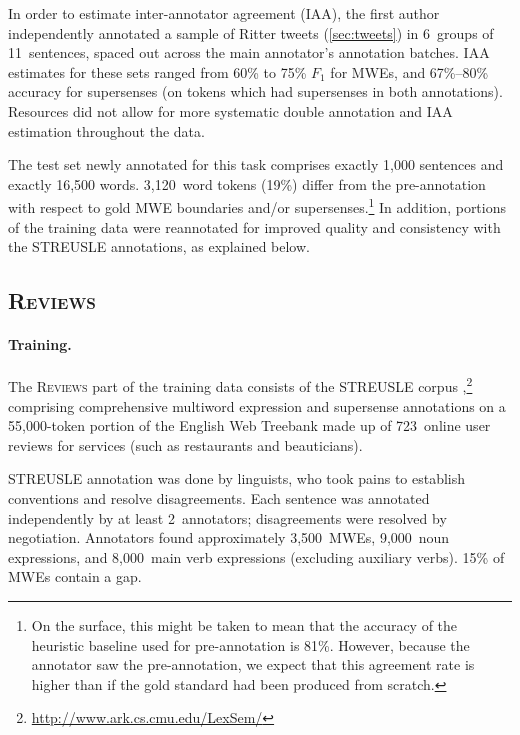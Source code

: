 \documentclass[11pt,letterpaper]{article}
\newcommand{\ensuretext}[1]{#1}
\newcommand{\nssmarker}{\ensuretext{\textcolor{magenta}{\ensuremath{^{\textsc{NS}}_{\textsc{S}}}}}}
\newcommand{\arkcomment}[3]{\ensuretext{\textcolor{#3}{[#1 #2]}}}
\newcommand{\nss}[1]{\arkcomment{\nssmarker}{#1}{magenta}}
\newcommand{\dataset}[1]{\mbox{\textsc{#1}}}	%
\newcommand{\finalversion}[1]{}
\begin{document}
In order to estimate inter-annotator agreement (IAA),
the first author independently annotated a sample of Ritter tweets (\cref{sec:tweets}) 
in 6~groups of 11~sentences, spaced out across the main annotator's annotation batches. 
IAA estimates for these sets ranged from 60\% to 75\% $F_1$ for MWEs, and 
67\%--80\% accuracy for supersenses (on tokens which had supersenses in both annotations).
Resources did not allow for more systematic double annotation and IAA estimation 
throughout the data.


The test set newly annotated for this task comprises exactly 1,000 sentences and exactly 16,500 words.
3,120~word tokens (19\%) differ from the pre-annotation with respect to gold MWE boundaries and/or supersenses.\footnote{On the surface, 
this might be taken to mean that the accuracy of the heuristic baseline used for pre-annotation is 81\%. 
However, because the annotator saw the pre-annotation, we expect that this agreement rate 
is higher than if the gold standard had been produced from scratch.}
In addition, portions of the training data were reannotated for improved quality and consistency 
with the STREUSLE annotations, as explained below.\finalversion{\nss{total size of training data?}}

\subsection{\dataset{Reviews}} 
\paragraph{Training.}
The \dataset{Reviews} part of the training data consists of the STREUSLE corpus \citep{schneider-14-corpus,schneider-15},\footnote{\url{http://www.ark.cs.cmu.edu/LexSem/}}
comprising comprehensive multiword expression and supersense annotations on a 55,000-token portion of the English Web Treebank \citep[EWTB;][]{ewtb} 
made up of 723~online user reviews for services (such as restaurants and beauticians).

STREUSLE annotation was done by linguists, who took pains to establish conventions and resolve disagreements.
Each sentence was annotated independently by at least 2~annotators; disagreements were resolved by negotiation. 
Annotators found approximately 3,500~MWEs, 9,000~noun expressions, and 8,000~main verb expressions (excluding auxiliary verbs).\finalversion{\nss{
(\Cref{tbl:reviews} offers a more detailed breakdown.)}}
15\% of MWEs contain a gap.
\end{document}
